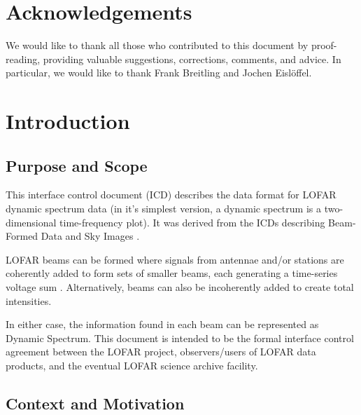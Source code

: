 \documentclass[a4paper,10pt,bibtotoc]{scrartcl}
\begin{document}




\section*{Acknowledgements}

We would like to thank all those who contributed to this document by
proof-reading, providing valuable suggestions, corrections, comments, and
advice. In particular, we would like to thank Frank Breitling and Jochen Eisl\"{o}ffel.

\clearpage


\section{Introduction}
\label{sec:introduction}

\subsection{Purpose and Scope}
\label{sec:purpose and scope}

This interface control document (ICD) describes the data format for LOFAR dynamic
spectrum data (in it's simplest version, a dynamic spectrum is 
a two-dimensional time-frequency plot). 
It was derived from the ICDs describing Beam-Formed
Data \cite{lofar.icd.003} and Sky Images \cite{lofar.icd.004}.

LOFAR beams can be formed where signals from antennae and/or stations are
coherently added to form sets of smaller beams, each generating a time-series
voltage sum \cite{vos.2004}.  Alternatively, beams can also be incoherently added to
create total intensities. 

In either case, the information found in each beam can
be represented as Dynamic Spectrum.
This document is intended to be the formal interface control agreement between
the LOFAR project, observers/users of LOFAR data products, and the eventual LOFAR
science archive facility. 

\subsection{Context and Motivation}
\label{sec:context and motivation}
\end{document}
